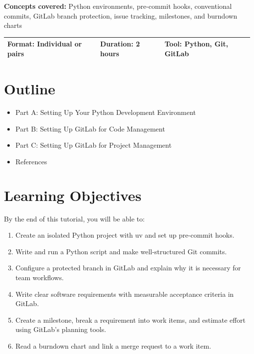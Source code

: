 \documentclass[11pt,a4paper]{book}
\begin{document}
\textbf{Concepts covered:} Python environments, pre-commit hooks, conventional commits, GitLab branch protection, issue tracking, milestones, and burndown charts

\begin{tabular}{lll}
\hline
\textbf{Format:} Individual or pairs & \textbf{Duration:} 2 hours & \textbf{Tool:} Python, Git, GitLab \\
\hline
\end{tabular}

\medskip

\section{Outline}

\begin{itemize}
  \item Part A: Setting Up Your Python Development Environment
  \item Part B: Setting Up GitLab for Code Management
  \item Part C: Setting Up GitLab for Project Management
  \item References
\end{itemize}

\medskip

\section{Learning Objectives}

By the end of this tutorial, you will be able to:

\begin{enumerate}
  \item Create an isolated Python project with uv and set up pre-commit hooks.
  \item Write and run a Python script and make well-structured Git commits.
  \item Configure a protected branch in GitLab and explain why it is necessary for team workflows.
  \item Write clear software requirements with measurable acceptance criteria in GitLab.
  \item Create a milestone, break a requirement into work items, and estimate effort using GitLab's planning tools.
  \item Read a burndown chart and link a merge request to a work item.
\end{enumerate}

\medskip
\end{document}
